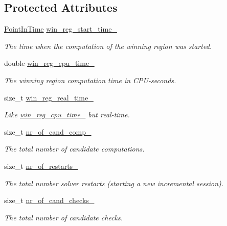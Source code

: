 \subsection*{Protected Attributes}
\begin{DoxyCompactItemize}
\item 
\hyperlink{Options_8h_af3a9f634f27bed7e98dbc23e5c6f807d}{Point\-In\-Time} \hyperlink{classLearnStatisticsSAT_a04c8091b3380c8d756d40aabeefbfbe1}{win\-\_\-reg\-\_\-start\-\_\-time\-\_\-}
\begin{DoxyCompactList}\small\item\em The time when the computation of the winning region was started. \end{DoxyCompactList}\item 
double \hyperlink{classLearnStatisticsSAT_af9823be5155743223790ae01b91b7ca8}{win\-\_\-reg\-\_\-cpu\-\_\-time\-\_\-}
\begin{DoxyCompactList}\small\item\em The winning region computation time in C\-P\-U-\/seconds. \end{DoxyCompactList}\item 
size\-\_\-t \hyperlink{classLearnStatisticsSAT_a97f7a6ccfc2d6677ae8a6c16dddd6b71}{win\-\_\-reg\-\_\-real\-\_\-time\-\_\-}
\begin{DoxyCompactList}\small\item\em Like \hyperlink{classLearnStatisticsSAT_af9823be5155743223790ae01b91b7ca8}{win\-\_\-reg\-\_\-cpu\-\_\-time\-\_\-} but real-\/time. \end{DoxyCompactList}\item 
size\-\_\-t \hyperlink{classLearnStatisticsSAT_a02de895c31e4c58396d5f07154e21561}{nr\-\_\-of\-\_\-cand\-\_\-comp\-\_\-}
\begin{DoxyCompactList}\small\item\em The total number of candidate computations. \end{DoxyCompactList}\item 
size\-\_\-t \hyperlink{classLearnStatisticsSAT_a07c8eee4a3c82762e3a94e38440f3adb}{nr\-\_\-of\-\_\-restarts\-\_\-}
\begin{DoxyCompactList}\small\item\em The total number solver restarts (starting a new incremental session). \end{DoxyCompactList}\item 
size\-\_\-t \hyperlink{classLearnStatisticsSAT_a1c3b6dff92cbcec06c944606c3555b64}{nr\-\_\-of\-\_\-cand\-\_\-checks\-\_\-}
\begin{DoxyCompactList}\small\item\em The total number of candidate checks. \end{DoxyCompactList}\item 

\end{DoxyCompactItemize}
